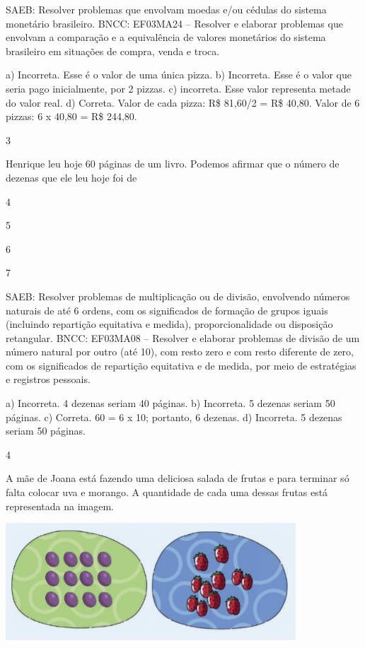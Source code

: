 {\begin{escolha}
{SAEB: Resolver problemas que envolvam moedas e/ou cédulas do sistema monetário brasileiro.
BNCC: EF03MA24 -- Resolver e elaborar problemas que envolvam a comparação e a equivalência de
valores monetários do sistema brasileiro em situações de compra, venda e troca.

a) Incorreta. Esse é o valor de uma única pizza.
b) Incorreta. Esse é o valor que seria pago inicialmente, por 2 pizzas.
c) incorreta. Esse valor representa metade do valor real.
d) Correta. Valor de cada pizza: R\$ 81,60/2 = R\$ 40,80. Valor de 6 pizzas: 6 x 40,80 = R\$ 244,80.

\num{3}

Henrique leu hoje 60 páginas de um livro. Podemos afirmar que o número de dezenas que ele leu hoje foi de

\begin{escolha}

\item
  4
\item
  5
\item
  6
\item
  7
\end{escolha}

SAEB: Resolver problemas de multiplicação ou de divisão, envolvendo números naturais de até 6 ordens, com os significados de formação de grupos iguais (incluindo repartição equitativa e medida),
proporcionalidade ou disposição retangular.
BNCC: EF03MA08 -- Resolver e elaborar problemas de divisão de um número natural por outro (até
10), com resto zero e com resto diferente de zero, com os significados de repartição equitativa
e de medida, por meio de estratégias e registros pessoais.

a) Incorreta. 4 dezenas seriam 40 páginas.
b) Incorreta. 5 dezenas seriam 50 páginas.
c) Correta. 60 = 6 x 10; portanto, 6 dezenas.
d) Incorreta. 5 dezenas seriam 50 páginas.

\num{4}

A mãe de Joana está fazendo uma deliciosa salada de frutas e para terminar só falta colocar uva e morango. A quantidade de cada uma dessas frutas está representada na imagem.


\includegraphics[width=4.26704in,height=1.75849in]{media/image132.png}

}
\end{escolha}}
